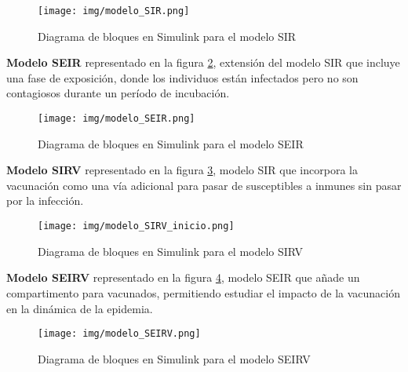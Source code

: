 \begin{figure}[H]
        \centering
        \texttt{[image: img/modelo\_SIR.png]}
        \caption{Diagrama de bloques en Simulink para el modelo SIR}
        \label{fig: diagrama de bloques en Simulink para el modelo SIR}
        \vspace{0.5cm} %
\end{figure}



\textbf{Modelo SEIR} representado en la figura \ref{fig: diagrama de bloques en Simulink para el modelo SEIR}, extensión del modelo SIR que incluye una fase de exposición, donde los individuos están infectados pero no son contagiosos durante un período de incubación.
\begin{figure}[H]
        \centering
        \texttt{[image: img/modelo\_SEIR.png]}
        \caption{Diagrama de bloques en Simulink para el modelo SEIR}
        \label{fig: diagrama de bloques en Simulink para el modelo SEIR}
        \vspace{0.5cm} %
\end{figure}

\textbf{Modelo SIRV} representado en la figura \ref{fig: diagrama de bloques en Simulink para el modelo SIRV}, modelo SIR que incorpora la vacunación como una vía adicional para pasar de susceptibles a inmunes sin pasar por la infección.
\begin{figure}[H]
        \centering
        \texttt{[image: img/modelo\_SIRV\_inicio.png]}
        \caption{Diagrama de bloques en Simulink para el modelo SIRV}
        \label{fig: diagrama de bloques en Simulink para el modelo SIRV}
        \vspace{0.5cm} %
\end{figure}


\textbf{Modelo SEIRV} representado en la figura \ref{fig: diagrama de bloques en Simulink para el modelo SEIRV}, modelo SEIR que añade un compartimento para vacunados, permitiendo estudiar el impacto de la vacunación en la dinámica de la epidemia.
\begin{figure}[H]
        \centering
        \texttt{[image: img/modelo\_SEIRV.png]}
        \caption{Diagrama de bloques en Simulink para el modelo SEIRV}
        \label{fig: diagrama de bloques en Simulink para el modelo SEIRV}
        \vspace{0.5cm} %
\end{figure}


